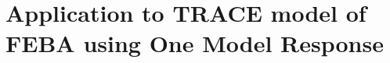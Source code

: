 \section{Application to TRACE model of FEBA using One Model Response}\label{sec:bayes_application_to_feba_univariate}
